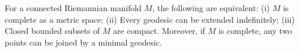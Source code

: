 For a connected Riemannian manifold $M$, the following are equivalent:
(i) $M$ is complete as a metric space;
(ii) Every geodesic can be extended indefinitely;
(iii) Closed bounded subsets of $M$ are compact.
Moreover, if $M$ is complete, any two points can be joined by a minimal geodesic.